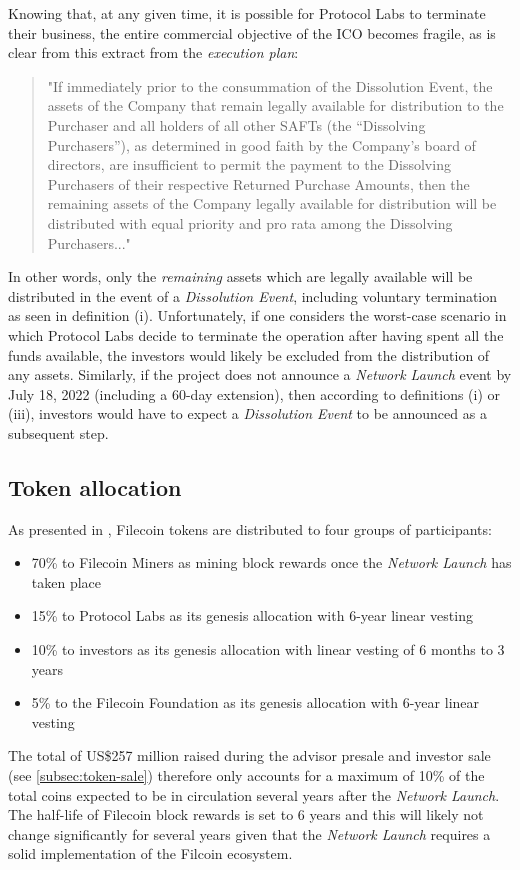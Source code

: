 \documentclass[conference]{IEEEtran}
\begin{document}
Knowing that, at any given time, it is possible for Protocol Labs to terminate their business, the entire commercial objective of the ICO becomes fragile, as is clear from this extract from the \textit{execution plan}:
\begin{quotation}
"If immediately prior to the consummation of the Dissolution Event, the assets of the Company that remain legally available for distribution to the Purchaser and all holders of all other SAFTs (the “Dissolving Purchasers”), as determined in good faith by the Company’s board of directors, are insufficient to permit the payment to the Dissolving Purchasers of their respective Returned Purchase Amounts, then the remaining assets of the Company legally available for distribution will be distributed with equal priority and pro rata among the Dissolving Purchasers..."\cite{saft-agreement}\end{quotation}
In other words, only the \textit{remaining} assets which are legally available will be distributed in the event of a \textit{Dissolution Event}, including voluntary termination as seen in definition (i).
Unfortunately, if one considers the worst-case scenario in which Protocol Labs decide to terminate the operation after having spent all the funds available, the investors would likely be excluded from the distribution of any assets.
Similarly, if the project does not announce a \textit{Network Launch}\cite{saft-agreement} event by July 18, 2022 (including a 60-day extension), then according to definitions (i) or (iii), investors would have to expect a \textit{Dissolution Event} to be announced as a subsequent step.

\subsection{Token allocation}
\label{subsec:token-allocation}
As presented in \cite{token-sale}, Filecoin tokens are distributed to four groups of participants:
\begin{itemize}
\item 70\% to Filecoin Miners as mining block rewards once the \textit{Network Launch} has taken place
\item 15\% to Protocol Labs as its genesis allocation with 6-year linear vesting
\item 10\% to investors as its genesis allocation with linear vesting of 6 months to 3 years
\item 5\% to the Filecoin Foundation as its genesis allocation with 6-year linear vesting
\end{itemize}
The total of US\$257 million raised during the advisor presale and investor sale (see \ref{subsec:token-sale}) therefore only accounts for a maximum of 10\% of the total coins expected to be in circulation several years after the \textit{Network Launch}.
The half-life of Filecoin block rewards is set to 6 years and this will likely not change significantly for several years given that the \textit{Network Launch} requires a solid implementation of the Filcoin ecosystem.
\end{document}
